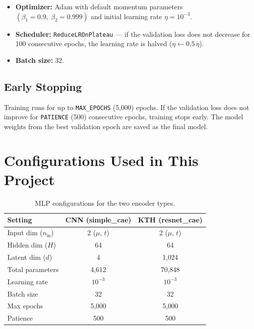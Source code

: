 \documentclass[11pt,a4paper]{article}
\begin{document}
\begin{itemize}[leftmargin=2em]
  \item \textbf{Optimizer:} Adam with default momentum parameters
    $(\beta_1\!=\!0.9,\;\beta_2\!=\!0.999)$ and initial learning rate
    $\eta = 10^{-3}$.
  \item \textbf{Scheduler:} \texttt{ReduceLROnPlateau} ---
    if the validation loss does not decrease for 100 consecutive epochs,
    the learning rate is halved ($\eta \leftarrow 0.5\,\eta$).
  \item \textbf{Batch size:} 32.
\end{itemize}

\subsection{Early Stopping}

Training runs for up to \texttt{MAX\_EPOCHS} (5{,}000) epochs.  If the
validation loss does not improve for \texttt{PATIENCE} (500) consecutive
epochs, training stops early.  The model weights from the best validation
epoch are saved as the final model.

\section{Configurations Used in This Project}

\begin{table}[h]
\centering
\caption{MLP configurations for the two encoder types.}
\label{tab:configs}
\begin{tabular}{@{}lcc@{}}
\toprule
\textbf{Setting} & \textbf{CNN (simple\_cae)} & \textbf{KTH (resnet\_cae)} \\
\midrule
Input dim ($n_{\mathrm{in}}$) & 2 ($\mu$, $t$) & 2 ($\mu$, $t$) \\
Hidden dim ($H$)              & 64              & 64 \\
Latent dim ($d$)              & 4               & 1{,}024 \\
Total parameters              & 4{,}612         & 70{,}848 \\
Learning rate                 & $10^{-3}$       & $10^{-3}$ \\
Batch size                    & 32              & 32 \\
Max epochs                    & 5{,}000         & 5{,}000 \\
Patience                      & 500             & 500 \\
\bottomrule
\end{tabular}
\end{table}
\end{document}
